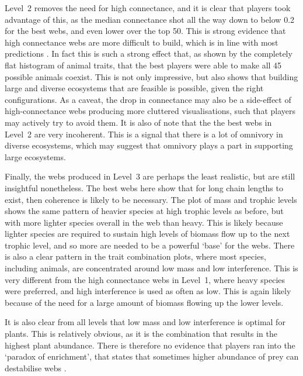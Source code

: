 Level~2 removes the need for high connectance, and it is clear that players took advantage of this, as the median connectance shot all the way down to below 0.2 for the best webs, and even lower over the top 50. This is strong evidence that high connectance webs are more difficult to build, which is in line with most predictions \cite{May1973,Allesina2012}.
In fact this is such a strong effect that, as shown by the completely flat histogram of animal traits, that the best players were able to make all 45 possible animals coexist. This is not only impressive, but also shows that building large and diverse ecosystems that are feasible is possible, given the right configurations.
As a caveat, the drop in connectance may also be a side-effect of high-connectance webs producing more cluttered visualisations, such that players may actively try to avoid them.
It is also of note that the the best webs in Level~2 are very incoherent. This is a signal that there is a lot of omnivory in diverse ecosystems, which may suggest that omnivory plays a part in supporting large ecosystems.

Finally, the webs produced in Level~3 are perhaps the least realistic, but are still insightful nonetheless. The best webs here show that for long chain lengths to exist, then coherence is likely to be necessary. The plot of mass and trophic levels shows the same pattern of heavier species at high trophic levels as before, but with more lighter species overall in the web than heavy. This is likely because lighter species are required to sustain high levels of biomass flow up to the next trophic level, and so more are needed to be a powerful `base' for the webs.
There is also a clear pattern in the trait combination plots, where most species, including animals, are concentrated around low mass and low interference. This is very different from the high connectance webs in Level~1, where heavy species were preferred, and high interference is used as often as low. This is again likely because of the need for a large amount of biomass flowing up the lower levels.

It is also clear from all levels that low mass and low interference is optimal for plants. This is relatively obvious, as it is the combination that results in the highest plant abundance. There is therefore no evidence that players ran into the `paradox of enrichment', that states that sometimes higher abundance of prey can destabilise webs \cite{Rosenzweig1971}.

